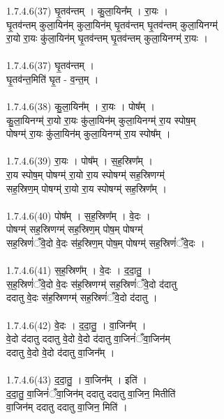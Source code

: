 \subsubsection{}
1.7.4.6(37)  घृ॒तव॑न्तम् । कु॒ला॒यिन᳚म् । रा॒यः ।\\
घृ॒तव॑न्तम् कुला॒यिन॑म् कुला॒यिन॑म् घृ॒तव॑न्तम् घृ॒तव॑न्तम् कुला॒यिनग्म्॑\\
रा॒यो रा॒यः कु॑ला॒यिन॑म् घृ॒तव॑न्तम् घृ॒तव॑न्तम् कुला॒यिनग्म्॑ रा॒यः ।\\
\\
1.7.4.6(37)  घृ॒तव॑न्तम् ।\\
घृ॒तव॑न्त॒मिति॑ घृ॒त - व॒न्त॒म् ।\\
\\
1.7.4.6(38)  कु॒ला॒यिन᳚म् । रा॒यः । पोष᳚म् ।\\
कु॒ला॒यिनग्म्॑ रा॒यो रा॒यः कु॑ला॒यिन॑म् कुला॒यिनग्म्॑ रा॒य स्पोष॒म् \\
पोषग्म्॑ रा॒यः कु॑ला॒यिन॑म् कुला॒यिनग्म्॑ रा॒य स्पोष᳚म् ।\\
\\
1.7.4.6(39)  रा॒यः । पोष᳚म् । स॒ह॒स्रिण᳚म् ।\\
रा॒य स्पोष॒म् पोषग्म्॑ रा॒यो रा॒य स्पोषग्म्॑ सह॒स्रिणग्म्॑ \\
सह॒स्रिण॒म् पोषग्म्॑ रा॒यो रा॒य स्पोषग्म्॑ सह॒स्रिण᳚म् ।\\
\\
1.7.4.6(40)  पोष᳚म् । स॒ह॒स्रिण᳚म् । वे॒दः ।\\
पोषग्म्॑ सह॒स्रिणग्म्॑ सह॒स्रिण॒म् पोष॒म् पोषग्म्॑ \\
सह॒स्रिणं॑ँवे॒दो वे॒दः स॑ह॒स्रिण॒म् पोष॒म् पोषग्म्॑ सह॒स्रिणं॑ँवे॒दः ।\\
\\
1.7.4.6(41)  स॒ह॒स्रिण᳚म् । वे॒दः । द॒दा॒तु॒ ।\\
स॒ह॒स्रिणं॑ँवे॒दो वे॒दः स॑ह॒स्रिणग्म्॑ सह॒स्रिणं॑ँवे॒दो द॑दातु\\
ददातु वे॒दः स॑ह॒स्रिणग्म्॑ सह॒स्रिणं॑ँवे॒दो द॑दातु ।\\
\\
1.7.4.6(42)  वे॒दः । द॒दा॒तु॒ । वा॒जिन᳚म् ।\\
वे॒दो द॑दातु ददातु वे॒दो वे॒दो द॑दातु वा॒जिनं॑ँवा॒जिन॑म् \\
ददातु वे॒दो वे॒दो द॑दातु वा॒जिन᳚म् ।\\
\\
1.7.4.6(43)  द॒दा॒तु॒ । वा॒जिन᳚म् । इति॑ ।\\
द॒दा॒तु॒ वा॒जिनं॑ँवा॒जिन॑म् ददातु ददातु वा॒जिन॒ मितीति॑ \\
वा॒जिन॑म् ददातु ददातु वा॒जिन॒ मिति॑ ।\\
